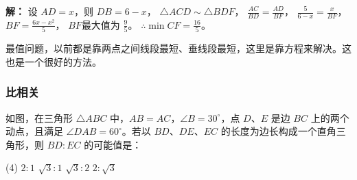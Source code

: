 \documentclass[../../algebra.tex]{subfiles}
\begin{document}
\textbf{解：}
设 $AD = x$，则 $DB=6-x$，\newline
$\triangle ACD \sim \triangle BDF$，\newline
$\frac{AC}{BD} = \frac{AD}{BF}$，\newline
$\frac{5}{6-x} = \frac{x}{BF}$，\newline
$BF = \frac{6x-x^2}{5}$，\newline
$BF$最大值为 $\frac{9}{5}$。\newline
$\therefore \min CF = \frac{16}{5}$。
\begin{tcolorbox}[colback=blue!5!white,colframe=blue!75!black,title=提示]
    最值问题，以前都是靠两点之间线段最短、垂线段最短，这里是靠方程来解决。这也是一个很好的方法。
\end{tcolorbox}
\subsubsection{比相关}
如图，在三角形 $\triangle ABC$ 中，$AB = AC$，$\angle B = 30^\circ$，点 $D$、$E$ 是边 $BC$ 上的两个动点，且满足 $\angle DAB = 60^\circ$。若以 $BD$、$DE$、$EC$ 的长度为边长构成一个直角三角形，则 $BD : EC$ 的可能值是：
\begin{center}


    \begin{tasks}(4) %
        \task[A.] $2 : 1$
        \task[B.] $\sqrt{3} : 1$
        \task[C.] $\sqrt{3} : 2$
        \task[D.] $2 : \sqrt{3}$
    \end{tasks}
\end{center}
\end{document}
